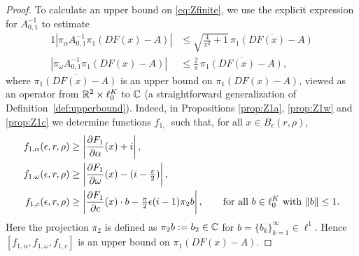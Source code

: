 \begin{proof}
To calculate an upper bound on \eqref{eq:Zfinite}, we use the explicit expression for $A_{0,1}^{-1}$ to estimate  
	\begin{alignat*}{1}
	\left| \pi_\alpha  A_{0,1}^{-1} \pi_1 \left( D F( x) - A \right)\right| &\leq  \sqrt{\tfrac{4}{\pi^2} + 1} \, \overline{\pi_1( DF( x ) - A) } \\
	\left| \pi_\omega  A_{0,1}^{-1} \pi_1 \left( D F( x) - A \right)\right| &\leq  \tfrac{2}{\pi} \,  \overline{ \pi_1( DF( x ) - A)  } ,
	\end{alignat*}
where $\overline{ \pi_1( DF( x ) - A)  }$ is an upper bound on $\pi_1( DF( x ) - A)$, viewed as an operator from $\mathbb{R}^2 \times \ell^K_0 $ to $\mathbb{C}$ (a straightforward generalization of Definition~\ref{def:upperbound}).
Indeed, in Propositions \ref{prop:Z1a}, \ref{prop:Z1w} and \ref{prop:Z1c} we   determine functions $f_{1,\cdot}$ such that, for all $x \in B_\epsilon(r,\rho)$, 
	\begin{alignat*}{1}
	f_{1,\alpha} (\epsilon,r,\rho) &\geq    \left|  \frac{\partial F_1 }{\partial \alpha} (x) + i  \right|  , \\
	f_{1,\omega} (\epsilon,r,\rho) &\geq   \left|  \frac{\partial F_1}{\partial \omega} (x)- (i- \tfrac{\pi}{2})  \right|   , \\
	f_{1,c} (\epsilon,r,\rho) &\geq   \left|  \frac{\partial F_1}{\partial c} (x) \cdot b -  \tfrac{\pi}{2} \epsilon (i-1) \pi_2 b \right| ,
	\qquad\text{for all $b\in\ell^K_0$ with $\|b\| \leq 1$}.
	\end{alignat*} 
Here the projection $\pi_2$ is defined as $\pi_2 b := b_2 \in \mathbb{C}$ for $b=\{b_k\}_{k=1}^{\infty} \in \ell^1$.	
	Hence $ [ f_{1,\alpha} , f_{1,\omega}, f_{1,c}]$ is an upper bound on $\pi_1 (DF( x ) -A )$.  
	

\end{proof}
